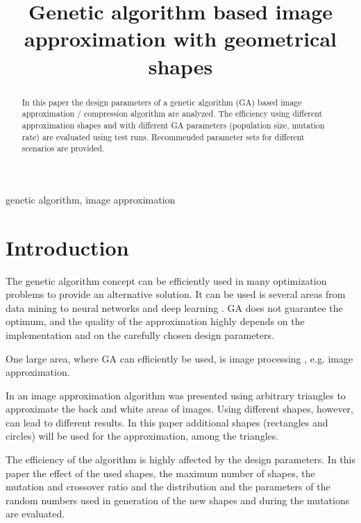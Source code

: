 \documentclass[conference]{IEEEtran}
\begin{document}
\title{Genetic algorithm based image approximation with geometrical shapes}

\author{
}

\maketitle

\begin{abstract}
In this paper the design parameters of a
genetic algorithm (GA) based image
approximation / compression algorithm are
analyzed. The efficiency using different
approximation shapes and with different GA
parameters (population size, mutation rate)
are evaluated using test runs. Recommended
parameter sets for different scenarios are
provided.
\end{abstract}

\begin{IEEEkeywords}
genetic algorithm, image approximation
\end{IEEEkeywords}

\section{Introduction}

The genetic algorithm \cite{ga-book} concept can be efficiently used in many
optimization problems to provide an alternative solution. It can be used is
several areas from data mining \cite{barman2017} to neural networks and deep learning \cite{such2017}.
GA does not guarantee the optimum, and the quality
of the approximation highly depends on the implementation and on the carefully
chosen design parameters.

One large area, where GA can efficiently be used, is image processing \cite{ga-imgseg},
e.g. image approximation.

In \cite{vakulya2021} an image approximation algorithm was presented using
arbitrary triangles to approximate the back and white areas of images.
Using different shapes, however, can lead to different
results. In this paper additional shapes (rectangles and circles) will be used
for the approximation, among the triangles.

The efficiency of the algorithm is highly affected by the design parameters. In
this paper the effect of the used shapes, the maximum number of shapes, the
mutation and crossover ratio and the distribution and the parameters of the
random numbers used in generation of the new shapes and during the mutations
are evaluated.
\end{document}
